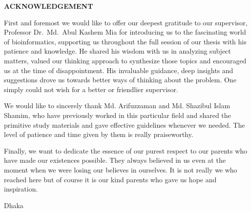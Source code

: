 \begin{center}
  \textbf{{\Large ACKNOWLEDGEMENT}}\\[60pt]
\end{center}

First and foremost we would like to offer our deepest gratitude to our supervisor, Professor Dr.\ Md.\ Abul Kashem Mia for introducing us to the fascinating world of bioinformatics, supporting us throughout the full session of our thesis with his patience and knowledge. He shared his wisdom with us in analyzing subject matters, valued our thinking approach to synthesize those topics and encouraged us at the time of disappointment. His invaluable guidance, deep insights and suggestions drove us towards better ways of thinking about the problem. One simply could not wish for a better or friendlier supervisor.  

We would like to sincerely thank Md. Arifuzzaman and Md. Shazibul Islam Shamim, who have previously worked in this particular field and shared the primitive study materials and gave effective guidelines whenever we needed. The level of patience and time given by them is really praiseworthy.

Finally, we want to dedicate the essence of our purest respect to our parents who have made our existences possible. They always believed in us even at the moment when we were losing our believes in ourselves. It is not really we who reached here but of course it is our kind parents who gave us hope and inspiration.

\vspace*{20.0mm}

\begin{minipage}[t]{0.2\textwidth}
  Dhaka\par
  \thesisdate
\end{minipage}%
\hfill
\begin{minipage}[t]{0.45\textwidth}
  \begin{enumerate}
    \vspace{-0.75\baselineskip}
  \end{enumerate}
\end{minipage}

\endinput
